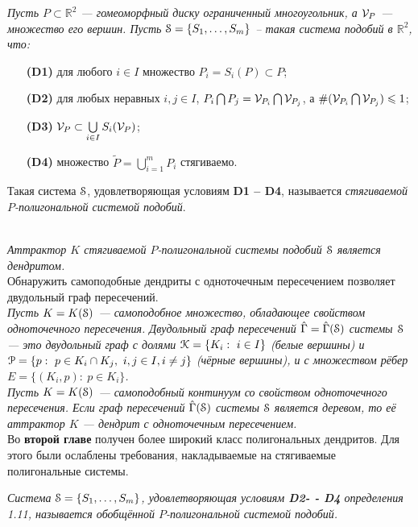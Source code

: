 \documentclass[a5paper,9pt,twoside]{extarticle} %
\begin{document}
{\em Пусть $P\subset\mathbb{R}^2$ --- гомеоморфный диску ограниченный многоугольник, а $ {\mathcal V}_P$ --- множество его вершин.
Пусть ${\EuScript S} = \{S_1, \ldots, S_m\}$ -- такая система подобий в ${\mathbb{R}}^2$, что:
\begin{itemize}[nolistsep]
\item[{\bf (D1)}] для любого $i \in I$ множество $P_i = S_i (P) \subset P$;
\item[{\bf (D2)}] для любых неравных $i, j \in I$, $P_i \bigcap P_j = {\mathcal V}_{P_i} \bigcap {\mathcal V}_{P_j}$, а $\#({\mathcal V}_{P_i} \bigcap {\mathcal V}_{P_j})\leqslant 1$;
\item[{\bf (D3)}] ${\mathcal V}_P \subset \bigcup \limits_{i \in I} S_i ({\mathcal V}_P)$;
\item[{\bf (D4)}] множество $\widetilde P = \bigcup \limits_{i = 1} ^m P_i$ стягиваемо.
\end{itemize}
Такая система ${\EuScript S}$, удовлетворяющая условиям {\bf D1 -- D4}, называется {\em стягиваемой $P$-полигональной системой подобий}.}\\

{\em Аттрактор $K$ стягиваемой $P$-полигональной системы подобий ${\EuScript S}$ является дендритом.}\\

Обнаружить самоподобные дендриты с одноточечным пересечением позволяет двудольный граф пересечений.\\

{\em Пусть $K=K({\EuScript S})$ --- самоподобное множество, обладающее свойством одноточечного пересечения.
{\em Двудольный граф пересечений} $\hat\Gamma=\hat\Gamma({\EuScript S})$ системы ${\EuScript S}$ --- это двудольный граф с долями ${\EuScript K}=\{K_i:\ i\in I\}$ (белые вершины) и ${\EuScript P}=\{p:\ p\in K_i\cap K_j,\ i,j\in I, i\neq j\}$ (чёрные вершины), и с множеством рёбер $E=\{(K_i,p):\ p\in K_i\}$.}\\

{\em Пусть $K=K({\EuScript S})$ --- самоподобный континуум со свойством одноточечного пересечения.
Если граф пересечений $\hat\Gamma({\EuScript S})$ системы ${\EuScript S}$ является деревом, то её аттрактор $K$ --- дендрит с одноточечным пересечением.}\\



Во \textbf{второй главе} получен более широкий класс полигональных дендритов.
Для этого были ослаблены требования, накладываемые на стягиваемые полигональные системы.

{\em Система ${\EuScript S}=\{S_1,\ldots ,S_m\} $, удовлетворяющая условиям {\bf D2- - D4} определения 1.11, называется обобщённой $P$-полигональной системой подобий.}
\end{document}
